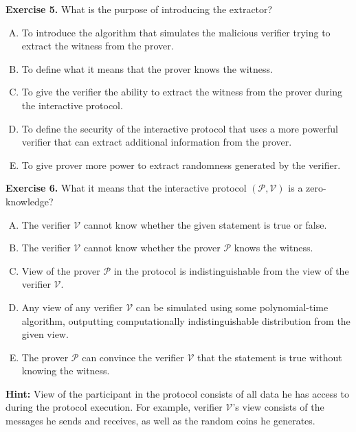 \documentclass[../lecture-notes-148x210.tex]{subfiles}
\begin{document}
\textbf{Exercise 5.} What is the purpose of introducing the extractor?
\begin{enumerate}[(A)]
    \item To introduce the algorithm that simulates the malicious verifier trying to extract the witness from the prover.
    \item To define what it means that the prover knows the witness.
    \item To give the verifier the ability to extract the witness from the prover during the interactive protocol.
    \item To define the security of the interactive protocol that uses a more powerful verifier that can extract additional information from the prover.
    \item To give prover more power to extract randomness generated by the verifier.
\end{enumerate}

\textbf{Exercise 6.} What it means that the interactive protocol $(\mathcal{P}, \mathcal{V})$ is a zero-knowledge?
\begin{enumerate}[(A)]
    \item The verifier $\mathcal{V}$ cannot know whether the given statement is true or false.
    \item The verifier $\mathcal{V}$ cannot know whether the prover $\mathcal{P}$ knows the witness.
    \item View of the prover $\mathcal{P}$ in the protocol is indistinguishable from the view of the verifier $\mathcal{V}$.
    \item Any view of any verifier $\mathcal{V}$ can be simulated using some polynomial-time algorithm, outputting computationally indistinguishable distribution from the given view.
    \item The prover $\mathcal{P}$ can convince the verifier $\mathcal{V}$ that the statement is true without knowing the witness.
 \end{enumerate}

\textbf{Hint:} View of the participant in the protocol consists of all data he has access to during the protocol execution. For example, verifier $\mathcal{V}$'s view consists of the messages he sends and receives, as well as the random coins he generates.

\end{document}

